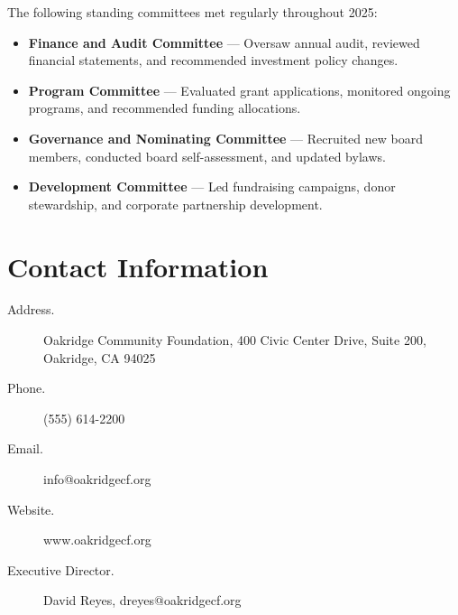 \documentclass[
    language=english,
    doctype=article,
    institution=none,
]{../../omnilatex}
\begin{document}
The following standing committees met regularly throughout 2025:

\begin{itemize}
    \item \textbf{Finance and Audit Committee} --- Oversaw annual audit,
        reviewed financial statements, and recommended investment policy
        changes.
    \item \textbf{Program Committee} --- Evaluated grant applications,
        monitored ongoing programs, and recommended funding allocations.
    \item \textbf{Governance and Nominating Committee} --- Recruited new
        board members, conducted board self-assessment, and updated
        bylaws.
    \item \textbf{Development Committee} --- Led fundraising campaigns,
        donor stewardship, and corporate partnership development.
\end{itemize}

\section{Contact Information}

\begin{description}
    \item[Address.] Oakridge Community Foundation, 400 Civic Center Drive,
        Suite 200, Oakridge, CA 94025
    \item[Phone.] (555) 614-2200
    \item[Email.] info@oakridgecf.org
    \item[Website.] www.oakridgecf.org
    \item[Executive Director.] David Reyes, dreyes@oakridgecf.org
\end{description}

\printbibliography[heading=none]
\end{document}
